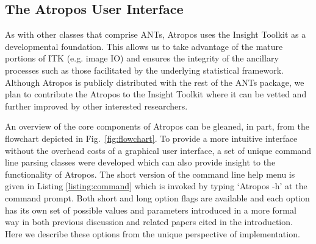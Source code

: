 \documentclass[11pt,english]{article}
\begin{document}
\subsection{The Atropos User Interface}
As with other classes that comprise ANTs, Atropos uses the Insight
Toolkit as a developmental foundation.  This allows us to take
advantage of the mature portions of ITK (e.g. image IO) and ensures
the integrity of the ancillary processes such as those facilitated by
the underlying statistical framework.  Although Atropos is publicly
distributed with the rest of the ANTs package, we plan to contribute
the Atropos to the Insight Toolkit where it can be vetted and further
improved by other interested researchers.

An overview of the core components of Atropos can be gleaned, in part, from the flowchart depicted in 
Fig.~\ref{fig:flowchart}.  To provide a more intuitive interface without the overhead costs of a graphical user interface, a set of unique command line parsing classes were developed which can also provide insight to the functionality of Atropos.  
The short version of the command line help menu is given in Listing \ref{listing:command} which is invoked by typing `{\ttfamily Atropos -h}' at the command prompt.  Both short and long option flags are available and each option has its own set of possible values and parameters introduced in a more formal way in both previous discussion and related papers cited in the introduction.  Here we  describe these options from the unique perspective of  implementation.
\end{document}
